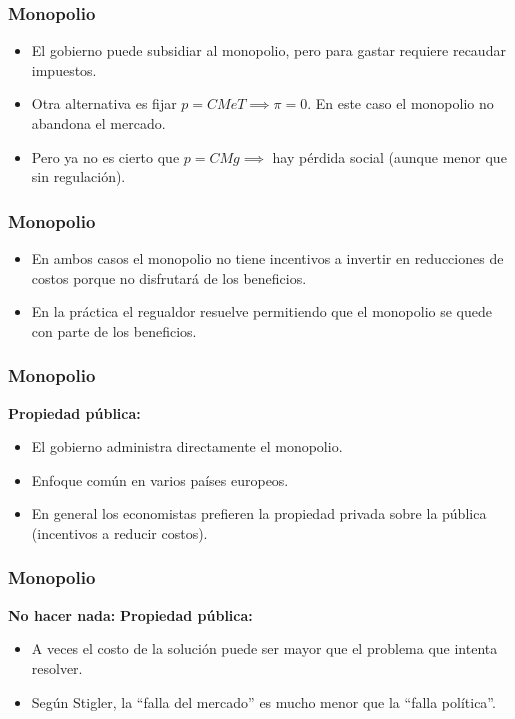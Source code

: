 \documentclass[dvipsnames,table,leqno]{beamer}
\begin{document}
		\begin{frame}
			\frametitle{Monopolio}
			\begin{itemize}
				\item El gobierno puede subsidiar al monopolio, pero para gastar requiere recaudar impuestos.
				\item Otra alternativa es fijar $p=CMeT\implies\pi=0$. En este caso el monopolio no abandona el mercado.
				\item Pero ya no es cierto que $p=CMg\implies$ hay pérdida social (aunque menor que sin regulación).
			\end{itemize}
		\end{frame}

		\begin{frame}
			\frametitle{Monopolio}
			\begin{itemize}
				\item En ambos casos el monopolio no tiene incentivos a invertir en reducciones de costos porque no disfrutará de los beneficios.
				\item En la práctica el regualdor resuelve permitiendo que el monopolio se quede con parte de los beneficios.
			\end{itemize}
		\end{frame}

		\begin{frame}
			\frametitle{Monopolio}
			\textbf{Propiedad pública:}
			\begin{itemize}
				\item El gobierno administra directamente el monopolio.
				\item Enfoque común en varios países europeos.
				\item En general los economistas prefieren la propiedad privada sobre la pública (incentivos a reducir costos).
			\end{itemize}
		\end{frame}

		\begin{frame}
			\frametitle{Monopolio}
			\textbf{No hacer nada:}
			\textbf{Propiedad pública:}
			\begin{itemize}
				\item A veces el costo de la solución puede ser mayor que el problema que intenta resolver.
				\item Según Stigler, la ``falla del mercado'' es mucho menor que la ``falla política''.
			\end{itemize}
		\end{frame}
	
\end{document}
